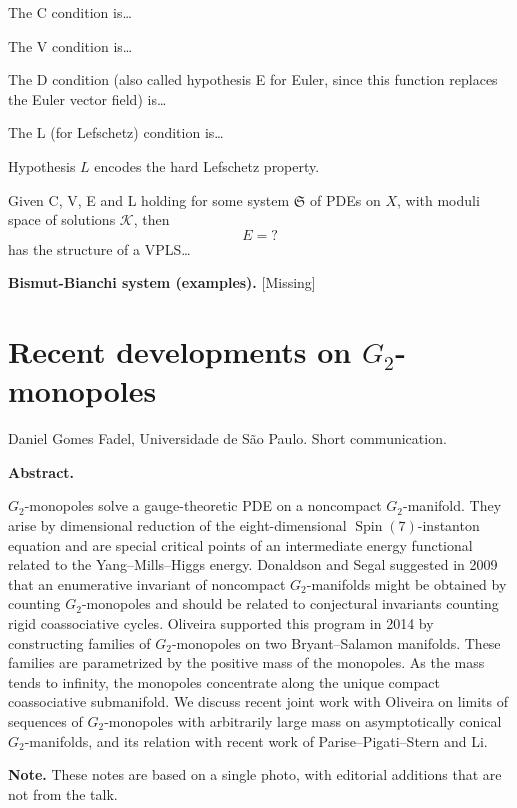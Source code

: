 \medskip\noindent
The C condition is…

The V condition is…

The D condition (also called hypothesis
E for Euler, since this function replaces
the Euler vector field) is…

The L (for Lefschetz) condition is…

Hypothesis $L$ encodes the hard
Lefschetz property.

\begin{proposition}
\label{proposition-fmas}
Given C, V, E and L holding for some
system $\mathfrak{S}$ of PDEs on $X$,
with moduli space of solutions $\mathcal{K}$,
then
$$
E=?
$$
has the structure of a VPLS…
\end{proposition}

\medskip\noindent
{\bf Bismut-Bianchi system (examples).}
[Missing]

\section{Recent developments on
$G_2$-monopoles}
\label{section-g2-monopoles}

\medskip\noindent
Daniel Gomes Fadel,
Universidade de S\~ao Paulo.
Short communication.

\medskip\noindent
{\bf Abstract.}

$G_2$-monopoles solve a gauge-theoretic
PDE on a noncompact $G_2$-manifold. They
arise by dimensional reduction of the
eight-dimensional
$\operatorname{Spin}(7)$-instanton
equation and are special critical points
of an intermediate energy functional
related to the Yang--Mills--Higgs energy.
Donaldson and Segal suggested in 2009
that an enumerative invariant of
noncompact $G_2$-manifolds might be
obtained by counting $G_2$-monopoles and
should be related to conjectural
invariants counting rigid coassociative
cycles. Oliveira supported this program
in 2014 by constructing families of
$G_2$-monopoles on two Bryant--Salamon
manifolds. These families are
parametrized by the positive mass of the
monopoles. As the mass tends to infinity,
the monopoles concentrate along the
unique compact coassociative submanifold.
We discuss recent joint work with
Oliveira on limits of sequences of
$G_2$-monopoles with arbitrarily large
mass on asymptotically conical
$G_2$-manifolds, and its relation with
recent work of Parise--Pigati--Stern and
Li.

\medskip\noindent
{\bf Note.} These notes are based
on a single photo, with editorial additions
that are not from the talk.


